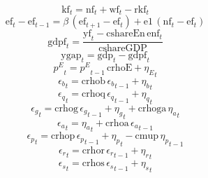 \begin{dmath}
{{\mathrm{kf}}}_{t}={{\mathrm{nf}}}_{t}+{{\mathrm{wf}}}_{t}-{{\mathrm{rkf}}}_{t}
\end{dmath}
\begin{dmath}
{{\mathrm{ef}}}_{t}-{{\mathrm{ef}}}_{t-1}={{\beta}}\, \left({{\mathrm{ef}}}_{t+1}-{{\mathrm{ef}}}_{t}\right)+{{\mathrm{e1}}}\, \left({{\mathrm{nf}}}_{t}-{{\mathrm{ef}}}_{t}\right)
\end{dmath}
\begin{dmath}
{{\mathrm{gdpf}}}_{t}=\frac{{{\mathrm{yf}}}_{t}-{{\mathrm{cshareEn}}}\, {{\mathrm{enf}}}_{t}}{{{\mathrm{cshareGDP}}}}
\end{dmath}
\begin{dmath}
{{\mathrm{ygap}}}_{t}={{\mathrm{gdp}}}_{t}-{{\mathrm{gdpf}}}_{t}
\end{dmath}
\begin{dmath}
{{p^{E}}}_{t}={{p^{E}}}_{t-1}\, {{\mathrm{crhoE}}}+{{\eta_{E}}}_{t}
\end{dmath}
\begin{dmath}
{{\epsilon_{b}}}_{t}={{\mathrm{crhob}}}\, {{\epsilon_{b}}}_{t-1}+{{\eta_{b}}}_{t}
\end{dmath}
\begin{dmath}
{{\epsilon_{q}}}_{t}={{\mathrm{crhoq}}}\, {{\epsilon_{q}}}_{t-1}+{{\eta_{q}}}_{t}
\end{dmath}
\begin{dmath}
{{\epsilon_{g}}}_{t}={{\mathrm{crhog}}}\, {{\epsilon_{g}}}_{t-1}+{{\eta_{g}}}_{t}+{{\mathrm{crhoga}}}\, {{\eta_{a}}}_{t}
\end{dmath}
\begin{dmath}
{{\epsilon_{a}}}_{t}={{\eta_{a}}}_{t}+{{\mathrm{crhoa}}}\, {{\epsilon_{a}}}_{t-1}
\end{dmath}
\begin{dmath}
{{\epsilon_{p}}}_{t}={{\mathrm{crhop}}}\, {{\epsilon_{p}}}_{t-1}+{{\eta_{p}}}_{t}-{{\mathrm{cmup}}}\, {{\eta_{p}}}_{t-1}
\end{dmath}
\begin{dmath}
{{\epsilon_{r}}}_{t}={{\mathrm{crhor}}}\, {{\epsilon_{r}}}_{t-1}+{{\eta_{r}}}_{t}
\end{dmath}
\begin{dmath}
{{\epsilon_{s}}}_{t}={{\mathrm{crhos}}}\, {{\epsilon_{s}}}_{t-1}+{{\eta_{s}}}_{t}
\end{dmath}
